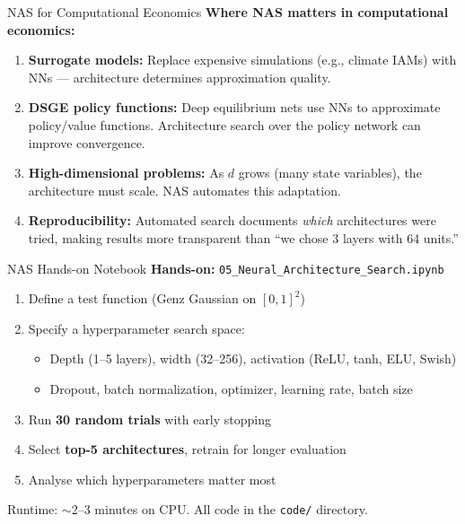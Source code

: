 \documentclass[aspectratio=169,11pt]{beamer}
\newcommand{\emphc}[1]{\textcolor{harvardcrimson}{#1}}
\begin{document}
\begin{frame}{NAS for Computational Economics}
\textbf{Where NAS matters in computational economics:}

\vspace{0.3cm}
\begin{enumerate}
    \item \textbf{Surrogate models:} Replace expensive simulations (e.g., climate IAMs) with NNs --- architecture determines approximation quality.

    \vspace{0.2cm}
    \item \textbf{DSGE policy functions:} Deep equilibrium nets use NNs to approximate policy/value functions. \emphc{Architecture search over the policy network} can improve convergence.

    \vspace{0.2cm}
    \item \textbf{High-dimensional problems:} As $d$ grows (many state variables), the architecture must scale. NAS automates this adaptation.

    \vspace{0.2cm}
    \item \textbf{Reproducibility:} Automated search documents \emph{which} architectures were tried, making results more transparent than ``we chose 3 layers with 64 units.''
\end{enumerate}
\end{frame}

\begin{frame}{NAS Hands-on Notebook}
\textbf{Hands-on:} \texttt{05\_Neural\_Architecture\_Search.ipynb}

\vspace{0.5em}
\begin{enumerate}
    \item Define a test function (Genz Gaussian on $[0,1]^2$)
    \item Specify a hyperparameter search space:
    \begin{itemize}
        \item Depth (1--5 layers), width (32--256), activation (ReLU, tanh, ELU, Swish)
        \item Dropout, batch normalization, optimizer, learning rate, batch size
    \end{itemize}
    \item Run \textbf{30 random trials} with early stopping
    \item Select \textbf{top-5 architectures}, retrain for longer evaluation
    \item Analyse which hyperparameters matter most
\end{enumerate}

\vspace{0.5em}
{\small Runtime: $\sim$2--3 minutes on CPU. All code in the \texttt{code/} directory.}
\end{frame}
\end{document}
